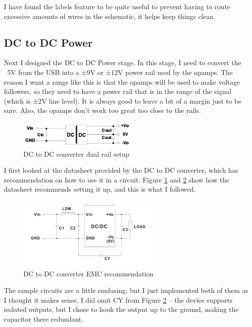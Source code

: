 \documentclass[a4paper]{article}
\begin{document}
I have found the labels feature to be quite useful to prevent having to route excessive amounts of wires in the schematic, it helps keep things clean.

\subsection{DC to DC Power}

Next I designed the DC to DC Power stage. In this stage, I need to convert the ~5V from the USB into a ±9V or ±12V power rail used by the opamps. The reason I want a range like this is that the opamps will be used to make voltage followers, so they need to have a power rail that is in the range of the signal (which is ±2V line level). It is always good to leave a bit of a margin just to be sure. Also, the opamps don't work too great too close to the rails.

\begin{figure}[h!]
\centering
\includegraphics[width=6cm]{images/pdme-dual}
\caption{DC to DC converter dual rail setup}
\label{fig:pdme-dual}
\end{figure}

I first looked at the datasheet provided by the DC to DC converter, which has recommendation on how to use it in a circuit. Figure \ref{fig:pdme-dual} and \ref{fig:pdme-emc} show how the datasheet recommends setting it up, and this is what I followed.

\begin{figure}[h!]
\centering
\includegraphics[width=7cm]{images/pdme-emc}
\caption{DC to DC converter EMC recommendation}
\label{fig:pdme-emc}
\end{figure}

The sample circuits are a little confusing, but I just implemented both of them as I thought it makes sense. I did omit CY from Figure \ref{fig:pdme-emc} -- the device supports isolated outputs, but I chose to hook the output up to the ground, making the capacitor there redundant.
\end{document}
